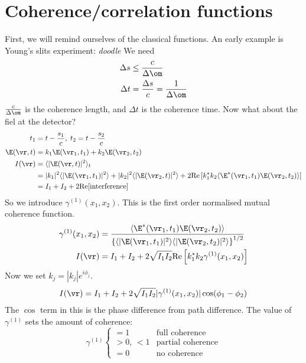 \documentclass[a4paper, 11pt, normalem]{report}
\begin{document}
\section{Coherence/correlation functions}
First, we will remind ourselves of the classical functions. 
An early example is Young's slits experiment:
\textit{doodle}
We need 
\begin{align}
    \Delta s &\leq \frac{c}{\Delta\om} \\
    \Delta t &= \frac{\Delta s}{c} = \frac{1}{\Delta\om}
\end{align}
$\frac{c}{\Delta\om}$ is the coherence length, and $\Delta t$ is the coherence time.
Now what about the fiel at the detector?
\begin{align}
    t_1 &= t-\frac{s_1}{c},\; t_2 = t-\frac{s_2}{c} \\
    \E(\vr,t) &= k_1\E(\vr_1,t_1) + k_2\E(\vr_2,t_2) \\
    I(\vr) &= \langle |\E(\vr,t)|^2\rangle_t \\
           &= |k_1|^2\langle|\E(\vr_1,t_1)|^2\rangle + |k_2|^2\langle|\E(\vr_2,t)|^2\rangle + 2\text{Re}\left[k_1^*k_2\langle\E^*(\vr_1,t_1)\E(\vr_2,t_2)\rangle\right] \\
           &= I_1 + I_2 + 2\text{Re}[\text{interference}]
\end{align}
So we introduce $\gamma^{(1)}(x_1,x_2)$.
This is the first order normalised mutual coherence function. 
\begin{align}
    \gamma^{(1)}(x_1,x_2) &= \frac{\langle\E^*(\vr_1,t_1)\E(\vr_2,t_2)\rangle}{\left\{\langle|\E(\vr_1,t_1)|^2\rangle\langle|\E(\vr_2,t_2)|^2\rangle\right\}^{1/2}} \\
    I(\vr) &= I_1 + I_2 + 2\sqrt{I_1I_2}\text{Re}\left[k_1^*k_2\gamma^{(1)}(x_1,x_2)\right]
\end{align}
Now we set $k_j = |k_j|e^{i\phi_j}$.
\begin{align}
    I(\vr) &= I_1 + I_2 + 2\sqrt{I_1I_2}|\gamma^{(1)}(x_1,x_2)|\cos(\phi_1-\phi_2) \\
\end{align}
The $\cos$ term in this is the phase difference from path difference.
The value of $\gamma^{(1)}$ sets the amount of coherence: 
\begin{equation}
    \gamma^{(1)} \begin{cases} = 1 & \text{full coherence} \\ >0,\,<1 & \text{partial coherence} \\ = 0 & \text{no coherence}\end{cases}
\end{equation}
\end{document}
